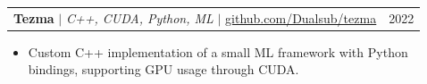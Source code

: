 \documentclass[a4paper,11pt]{article}
\makeatletter
\newcommand{\resumeItem}[1]{
  \item\small{
    {#1 \vspace{-2pt}}
  }
}
\newcommand{\resumeProjectHeading}[2]{
    \item
    \begin{tabular*}{0.97\textwidth}{l@{\extracolsep{\fill}}r}
      \small#1 & #2 \\
    \end{tabular*}\vspace{-7pt}
}
\newcommand{\resumeItemListStart}{\begin{itemize}}
\newcommand{\resumeItemListEnd}{\end{itemize}\vspace{-5pt}}
\makeatother
\begin{document}
\resumeProjectHeading
{\textbf{Tezma} $|$ \emph{C++, CUDA, Python, ML} $|$ \href{https://github.com/Dualsub/tezma}{\underline{github.com/Dualsub/tezma}}}{2022}
\resumeItemListStart
\resumeItem{Custom C++ implementation of a small ML framework with Python bindings, supporting GPU usage through CUDA.}
\resumeItemListEnd



%


\end{document}
